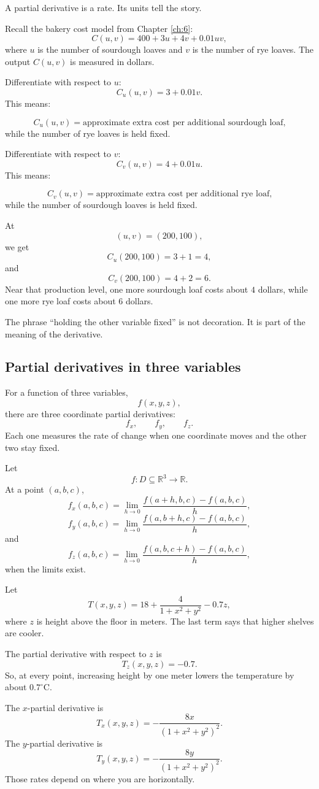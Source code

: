 A partial derivative is a rate.  Its units tell the story.

Recall the bakery cost model from Chapter \ref{ch:6}:
\[
    C(u,v)=400+3u+4v+0.01uv,
\]
where \(u\) is the number of sourdough loaves and \(v\) is the number of rye loaves.
The output \(C(u,v)\) is measured in dollars.

Differentiate with respect to \(u\):
\[
    C_u(u,v)=3+0.01v.
\]
This means:

\[
    C_u(u,v)
    =
    \text{approximate extra cost per additional sourdough loaf,}
\]
while the number of rye loaves is held fixed.

Differentiate with respect to \(v\):
\[
    C_v(u,v)=4+0.01u.
\]
This means:

\[
    C_v(u,v)
    =
    \text{approximate extra cost per additional rye loaf,}
\]
while the number of sourdough loaves is held fixed.

At
\[
    (u,v)=(200,100),
\]
we get
\[
    C_u(200,100)=3+1=4,
\]
and
\[
    C_v(200,100)=4+2=6.
\]
Near that production level, one more sourdough loaf costs about \(4\) dollars, while
one more rye loaf costs about \(6\) dollars.

The phrase ``holding the other variable fixed'' is not decoration.  It is part of the
meaning of the derivative.

\subsection{Partial derivatives in three variables}

For a function of three variables,
\[
    f(x,y,z),
\]
there are three coordinate partial derivatives:
\[
    f_x,\qquad f_y,\qquad f_z.
\]
Each one measures the rate of change when one coordinate moves and the other two stay
fixed.

\begin{definition}
Let
\[
    f:D\subseteq\mathbb R^3\to\mathbb R.
\]
At a point \((a,b,c)\),
\[
\boxed{
    f_x(a,b,c)
    =
    \lim_{h\to0}
    \frac{f(a+h,b,c)-f(a,b,c)}{h},
}
\]
\[
\boxed{
    f_y(a,b,c)
    =
    \lim_{h\to0}
    \frac{f(a,b+h,c)-f(a,b,c)}{h},
}
\]
and
\[
\boxed{
    f_z(a,b,c)
    =
    \lim_{h\to0}
    \frac{f(a,b,c+h)-f(a,b,c)}{h},
}
\]
when the limits exist.
\end{definition}

\begin{example}
Let
\[
    T(x,y,z)=18+\frac{4}{1+x^2+y^2}-0.7z,
\]
where \(z\) is height above the floor in meters.  The last term says that higher shelves
are cooler.

The partial derivative with respect to \(z\) is
\[
    T_z(x,y,z)=-0.7.
\]
So, at every point, increasing height by one meter lowers the temperature by about
\(0.7^\circ\)C.

The \(x\)-partial derivative is
\[
    T_x(x,y,z)
    =
    -\frac{8x}{(1+x^2+y^2)^2}.
\]
The \(y\)-partial derivative is
\[
    T_y(x,y,z)
    =
    -\frac{8y}{(1+x^2+y^2)^2}.
\]
Those rates depend on where you are horizontally.
\end{example}

